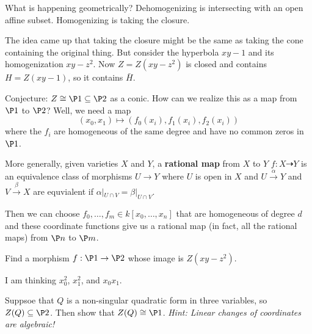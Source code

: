\documentclass[12pt]{article}
\begin{document}
What is happening geometrically? Dehomogenizing is intersecting with an open affine subset. Homogenizing is taking the closure.
\begin{rmk}
	The idea came up that taking the closure might be the same as taking the cone containing the original thing. But consider 
	the hyperbola $xy-1$ and its homogenization $xy-z^2$. Now $Z=Z(xy-z^2)$ is closed and contains $H=Z(xy-1)$, so it contains $\bar H$.

	Conjecture: $Z\cong \P1\subseteq\P2$ as a conic. How can we realize this as a map from $\P1$ to $\P2$? Well,
	we need a map 
	\[(x_0,x_1)\mapsto(f_0(x_i),f_1(x_i),f_2(x_i))\]
	where the $f_i$ are homogeneous of the same degree and have no common zeros in $\P1$.
\end{rmk}
\begin{rmk}
	More generally, given varieties $X$ and $Y$, a \textbf{rational map} from $X$ to $Y$ $f:X\dashrightarrow Y$ is an equivalence class of morphisms $U\to Y$ where $U$ is open in $X$ 
	and $U\xrightarrow{\alpha} Y$ and $V\xrightarrow{\beta}X$ are equvialent if $\alpha|_{U\cap V}=\beta|_{U\cap V}$.

	Then we can choose $f_0,\dots,f_m\in k[x_0,\dots,x_n]$ that are homogeneous of degree $d$ and these coordinate functions give us a rational map (in fact, all the rational maps) from $\P n$ to $\P m$.
\end{rmk}
\begin{prob}
	Find a morphism $f:\P1\to\P2$ whose image is $Z(xy-z^2)$.
\end{prob}
I am thinking $x_0^2$, $x_1^2$, and $x_0x_1$.
\begin{prob}
	Suppsoe that $Q$ is a non-singular quadratic form in three variables, so $Z(Q)\subseteq \P2$. Then show that $Z(Q)\cong \P1$.
	\textit{Hint: Linear changes of coordinates are algebraic!}
\end{prob}
\end{document}
